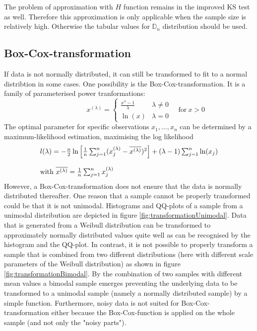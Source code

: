 \documentclass[a4paper, 12pt, titlepage, headsepline, listof = totoc, bibliography = totoc, numbers = noenddot]{scrartcl}
\begin{document}
The problem of approximation with $H$ function remains in the improved KS test
as well. Therefore this approximation is only applicable when 
the sample size is relatively high. Otherwise the tabular values for
$\mathbb{D}_n$ distribution should be used. 



\subsection{Box-Cox-transformation}

If data is not normally distributed, it can still be transformed to fit to a normal distribtion in some cases. One possibility is the Box-Cox-transformation. It is a family of parameterised power tranformations:
\[
  \phantom{\quad\mbox{for}\ x > 0}
   x^{(\lambda)} =
   \left\{ 
    \begin{array}{cl}
                 \frac{x^\lambda - 1}{\lambda} & \lambda \neq 0\\
                 \ln(x) & \lambda = 0
    \end{array}
   \right.
   \quad\mbox{for}\ x > 0
\]
The optimal parameter for specific observations $x_1, \dots, x_n$ can be determined by a maximum-likelihood estimation, maximising the log likelihood
\[
\begin{array}{l}
\vspace{12pt}
   l(\lambda) = - \frac{n}{2}\ln\left[\frac{1}{n}\sum_{j=1}^{n}(x_j^{(\lambda)} - \overline{x^{(\lambda)}})^2\right] + (\lambda - 1) \sum_{j=1}^{n}\ln(x_j)\\
   \mbox{with}\ \overline{x^{(\lambda)}} = \frac{1}{n} \sum_{j=1}^{n}x_j^{(\lambda)}
\end{array}
\]
However, a Box-Cox-transformation does not ensure that the data is normally distributed thereafter. One reason that a sample cannot be properly transformed could be that it is not unimodal. Histograms and QQ-plots of a sample from a unimodal distribution are depicted in figure \ref{fig:transformationUnimodal}. Data that is generated from a Weibull distribution can be transformed to approximately normally distributed values quite well as can be recognised by the histogram and the QQ-plot. In contrast, it is not possible to properly transform a sample that is combined from two different distributions (here with different scale parameters of the Weibull distribution) as shown in figure \ref{fig:transformationBimodal}. By the combination of two samples with different mean values a bimodal sample emerges preventing the underlying data to be transformed to a unimodal sample (namely a normally distributed sample) by a simple function. Furthermore, noisy data is not suited for Box-Cox-transformation either because the Box-Cox-function is applied on the whole sample (and not only the "noisy parts").
\newpage
\phantom{.}
\vfill
\end{document}
